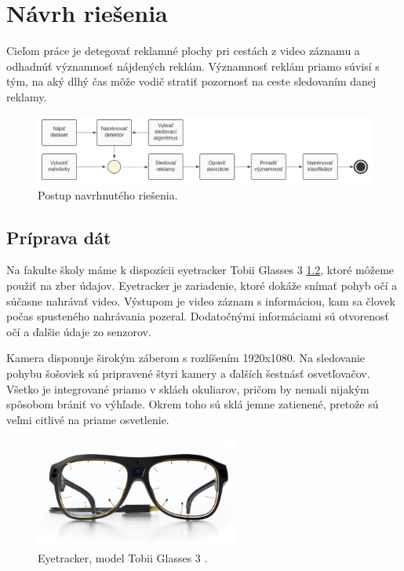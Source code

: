 \chapter{Návrh riešenia}\label{chap:proposal}

Cieľom práce je detegovať reklamné plochy pri cestách z video záznamu a odhadnúť významnosť nájdených reklám. Významnosť reklám priamo súvisí s tým, na aký dlhý čas môže vodič stratiť pozornosť na ceste sledovaním danej reklamy.
\\

\begin{figure}[ht]
    \centering
    \includegraphics[width=1\textwidth]{images/02/plan2.png}
    \caption{Postup navrhnutého riešenia.}
    \label{img:road}
\end{figure}

\section{Príprava dát}

Na fakulte školy máme k dispozícii eyetracker Tobii Glasses 3 \ref{img:tobii}, ktoré môžeme použiť na zber údajov. Eyetracker je zariadenie, ktoré dokáže snímať pohyb očí a súčasne nahrávať video. Výstupom je video záznam s informáciou, kam sa človek počas spusteného nahrávania pozeral. Dodatočnými informáciami sú otvorenosť očí a ďalšie údaje zo senzorov.

Kamera disponuje širokým záberom s rozlíšením 1920x1080. Na sledovanie pohybu šošoviek sú pripravené štyri kamery a ďalších šestnásť osvetľovačov. Všetko je integrované priamo v sklách okuliarov, pričom by nemali nijakým spôsobom brániť vo výhľade. Okrem toho sú sklá jemne zatienené, pretože sú veľmi citlivé na priame osvetlenie.


\begin{figure}[ht]
    \centering
    \includegraphics[width=0.6\textwidth]{images/02/glasses.jpg}
    \caption{Eyetracker, model Tobii Glasses 3 \cite{tobii}.}
    \label{img:tobii}
\end{figure}

